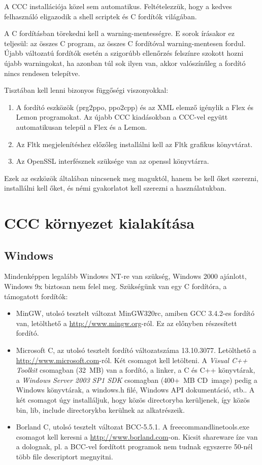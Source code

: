 A CCC installációja közel sem automatikus. 
Feltételezzük, hogy a kedves felhasználó eligazodik
a shell scriptek és C fordítók világában. 

A C fordításban törekedni kell a warning-mentességre.
E sorok írásakor ez teljesül: az összes C program, az összes
C fordítóval warning-mentesen fordul. Újabb változatú
fordítók esetén a szigorúbb ellenőrzés felszínre szokott hozni
újabb warningokat, ha azonban túl sok ilyen van, akkor
valószínűleg a fordító nincs rendesen telepítve.

 
Tisztában kell lenni bizonyos függőségi viszonyokkal:
\begin{enumerate}
\item 
  A fordító eszközök (prg2ppo, ppo2cpp) és az XML elemző
  igénylik a Flex és Lemon programokat. Az újabb CCC kiadásokban
  a CCC-vel együtt automatikusan települ a Flex és a Lemon. 
\item 
  Az Fltk megjelenítéshez előzőleg installálni kell az Fltk
  grafikus könyvtárat.
\item
  Az OpenSSL interfésznek szüksége van az openssl könyvtárra.  
\end{enumerate}
Ezek az eszközök általában nincsenek meg maguktól, 
hanem be kell őket szerezni, installálni kell őket, 
és némi gyakorlatot kell szerezni a használatukban.
 

\section{CCC környezet kialakítása}

\subsection{Windows}

Mindenképpen legalább Windows NT-re van szükség, Windows 2000 ajánlott, 
Windows 9x biztosan nem felel meg.
Szükségünk van egy C fordítóra, a támogatott fordítók:
\begin{itemize}
\item 
    MinGW, utolsó tesztelt változat MinGW320rc, 
    amiben GCC 3.4.2-es fordító van,
    letölthető a \href{http://www.mingw.org}{http://www.mingw.org}-ról.
    Ez az előnyben részesített fordító.
\item 
    Microsoft C, az utolsó tesztelt fordító változatszáma 13.10.3077.
    Letölthető a \href{http://www.microsoft.com}{http://www.microsoft.com}-ról.
    Két csomagot kell letölteni. A {\em Visual C++ Toolkit} csomagban (32~MB)
    van a fordító, a linker, a C és C++ könyvtárak, 
    a {\em Windows Server 2003 SP1 SDK} csomagban (400+~MB CD~image) pedig 
    a Windows könyvtárak, a windows.h filé, Windows API dokumentáció, stb.. 
    A két csomagot úgy installáljuk, hogy közös directoryba kerüljenek, 
    így közös bin, lib, include  directorykba kerülnek  az alkatrészeik.
\item 
    Borland C, utolsó tesztelt változat BCC-5.5.1. 
    A freecommandlinetools.exe csomagot kell keresni a
    \href{http://www.borland.com}{http://www.borland.com}-on.
    Kicsit shareware íze van a dolognak, pl. a BCC-vel fordított 
    programok nem tudnak egyszerre 50-nél több file descriptort megnyitni.
\end{itemize}


